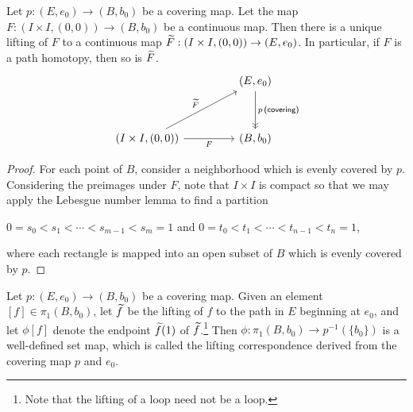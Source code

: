 \begin{thm}
    Let $p: (E, e_0)\rightarrow (B, b_0)$ be a covering map.
    Let the map $F: (I\times I, (0, 0))\rightarrow (B, b_0)$ be a continuous map.
    Then there is a unique lifting of $F$ to a continuous map $\widetilde{F}: (I\times I, (0, 0))\rightarrow (E, e_0)$.
    In particular, if $F$ is a path homotopy, then so is $\widetilde{F}$.
    \begin{equation*}
    \begin{tikzcd}[row sep=1.2cm, column sep=1.6cm]
        &
        (E, e_0)
        \arrow[d, "p\,\textsf{(covering)}", ->>]
        \\
        (I\times I, (0, 0))
        \arrow[ur, "\wt{F}"]
        \arrow[r, "F"']
        &
        (B, b_0)
    \end{tikzcd}
    \end{equation*}
\end{thm}
\begin{proof}
    For each point of $B$, consider a neighborhood which is evenly covered by $p$.
    Considering the preimages under $F$, note that $I\times I$ is compact so that we may apply the Lebesgue number lemma to find a partition
    \begin{center}
        $0=s_0<s_1<\cdots<s_{m-1}<s_m=1$ and $0=t_0<t_1<\cdots<t_{n-1}<t_n=1$,
    \end{center}
    where each rectangle is mapped into an open subset of $B$ which is evenly covered by $p$.
\end{proof}

\begin{defi}
    Let $p: (E, e_0)\rightarrow (B, b_0)$ be a covering map.
    Given an element $[f]\in\pi_1(B, b_0)$, let $\widetilde{f}$ be the lifting of $f$ to the path in $E$ beginning at $e_0$, and let $\phi[f]$ denote the endpoint $\widetilde{f}(1)$ of $\widetilde{f}$.\footnote{Note that the lifting of a loop need not be a loop.}
    Then $\phi: \pi_1(B, b_0)\rightarrow p^{-1}(\{b_0\})$ is a well-defined set map, which is called the lifting correspondence derived from the covering map $p$ and $e_0$.
\end{defi}

